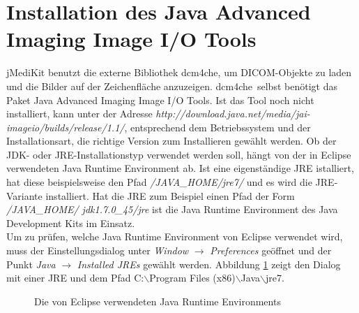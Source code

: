 \section{Installation des Java Advanced Imaging Image I/O Tools} \label{jai_install}
jMediKit benutzt die externe Bibliothek \glqq dcm4che\grqq, um DICOM-Objekte zu laden und die Bilder auf der Zeichenfläche anzuzeigen. \glqq dcm4che\grqq\ selbst benötigt das Paket \glqq Java Advanced Imaging Image I/O Tools\grqq. Ist das Tool noch nicht installiert, kann unter der Adresse \textit{http://download.java.net/media/jai-imageio/builds/release/1.1/}, entsprechend dem Betriebssystem und der Installationsart, die richtige Version zum Installieren gewählt werden. Ob der JDK- oder JRE-Installationstyp verwendet werden soll, hängt von der in Eclipse verwendeten Java Runtime Environment ab. Ist eine eigenständige JRE istalliert, hat diese beispielsweise den Pfad \textit{/JAVA\_HOME/jre7/} und es wird die JRE-Variante installiert. Hat die JRE zum Beispiel einen Pfad der Form \textit{/JAVA\_HOME/ jdk1.7.0\_45/jre} ist die Java Runtime Environment des Java Development Kits im Einsatz.\\
Um zu prüfen, welche Java Runtime Environment von Eclipse verwendet wird, muss der Einstellungsdialog unter \textit{Window} $\rightarrow$ \textit{Preferences} geöffnet und der Punkt \textit{Java} $\rightarrow$ \textit{Installed JREs} gewählt werden. Abbildung \ref{jai} zeigt den Dialog mit einer JRE und dem Pfad C:$\backslash$Program Files (x86)$\backslash$Java$\backslash$jre7.
\begin{figure}[H]
  \vspace{0.5cm}
  \centering
  \caption{Die von Eclipse verwendeten Java Runtime Environments}
  \label{jai}
  \vspace{0.5cm}
\end{figure}

